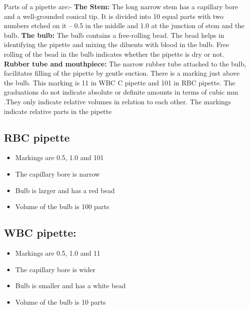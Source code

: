 \documentclass[a4paper,12pt]{book}
\begin{document}
					Parts of a pipette are:-\newline
					\textbf{The Stem:}
					The long narrow stem has a capillary bore and a well-grounded conical tip. It is divided into 10 equal parts with two numbers etched on it – 0.5 in the middle and 1.0 at the junction of stem and the bulb.\newline
					\textbf{The bulb:}
					The bulb contains a free-rolling bead. The bead helps in identifying the pipette and mixing the diluents with blood in the bulb. Free rolling of the bead in the bulb indicates whether the pipette is dry or not.\newline
					\textbf{Rubber tube and mouthpiece:}
					The narrow rubber tube attached to the bulb, facilitates filling of the pipette by gentle suction. There is a marking just above the bulb. This marking is 11 in WBC C pipette and 101 in RBC pipette. The graduations do not indicate absolute or definite amounts in terms of cubic mm .They only indicate relative volumes in relation to each other. The markings indicate relative parts in the pipette\newline

					\subsection*{RBC pipette}
					\begin{itemize}

						\item{Markings are 0.5, 1.0 and 101}
						\item{The capillary bore is narrow}
						\item{Bulb is larger and has a red bead}
						\item{Volume of the bulb is 100 parts}
					\end{itemize}

					\subsection*{WBC pipette:}
					\begin{itemize}
						\item{Markings are 0.5, 1.0 and 11}
						\item{The capillary bore is wider}
						\item{Bulb is smaller and has a white bead}
						\item{Volume of the bulb is 10 parts}
					\end{itemize}
\end{document}
